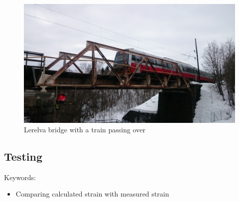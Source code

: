 \begin{figure}[H]
	\includegraphics[width=\textwidth]{figures/train_passing.jpg}
	\caption{Lerelva bridge with a train passing over}
	\label{fig:lerelva_bridge}
\end{figure}


\subsection{Testing}
Keywords:
\begin{itemize}
\item Comparing calculated strain with measured strain
\end{itemize}
